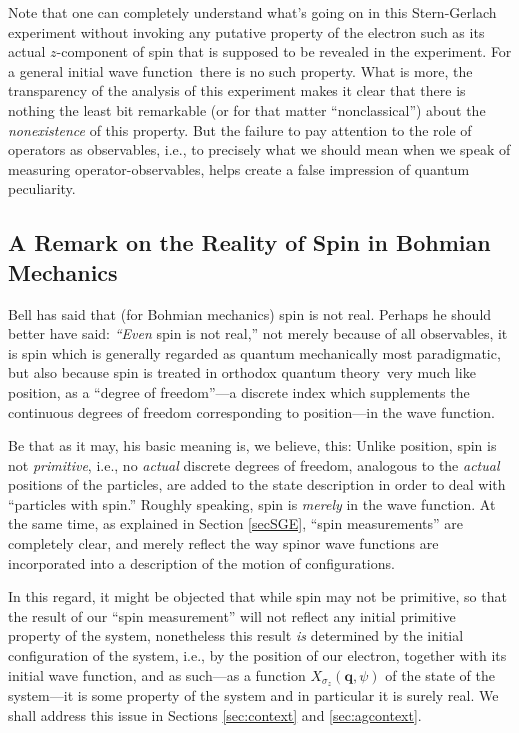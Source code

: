 \documentclass[12pt]{article}
\newcommand{\BM}{Bohmian mechanics}
\newcommand{\qt}{quantum theory}
\newcommand{\wf}{wave function}
\begin{document}
Note that one can completely understand what's going on in this
Stern-Gerlach experiment without invoking any putative property of the
electron such as its actual $z$-component of spin that is supposed to
be revealed in the experiment.  For a general initial \wf\ there is no
such property. What is more, the transparency of the analysis of this
experiment makes it clear that there is nothing the least bit
remarkable (or for that matter ``nonclassical'') about the {\it
   nonexistence\/} of this property.  But the failure to pay attention
to the role of operators as observables, i.e., to precisely what we
should mean when we speak of measuring operator-observables, helps
create a false impression of quantum peculiarity.

\subsection{A Remark on the Reality of Spin in Bohmian Mechanics}

Bell has said that (for \BM) spin is not real.  Perhaps he should
better have said: {\it ``Even\/} spin is not real,'' not merely
because of all observables, it is spin which is generally regarded as
quantum mechanically most paradigmatic, but also because spin is
treated in orthodox \qt\ very much like position, as a ``degree of
freedom''---a discrete index which supplements the continuous degrees
of freedom corresponding to position---in the \wf.

Be that as it may, his basic meaning is, we believe, this: Unlike
position, spin is not {\it primitive\/}, i.e., no {\it actual\/}
discrete degrees of freedom, analogous to the {\it actual\/} positions
of the particles, are added to the state description in order to deal
with ``particles with spin.''  Roughly speaking, spin is {\it
   merely\/} in the \wf.  At the same time, as explained in Section
\ref{secSGE}, ``spin measurements'' are completely clear, and merely
reflect the way spinor \wf s are incorporated into a description of
the motion of configurations.

In this regard, it might be objected that while spin may not be
primitive, so that the result of our ``spin measurement'' will not
reflect any initial primitive property of the system, nonetheless this
result {\it is\/} determined by the initial configuration of the
system, i.e., by the position of our electron, together with its
initial \wf, and as such---as a function $X_{\sigma_z}(\mathbf{q},
\psi)$ of the state of the system---it is some property of the system
and in particular it is surely real.  We shall address this issue in
Sections \ref{sec:context} and \ref{sec:agcontext}.
\end{document}
